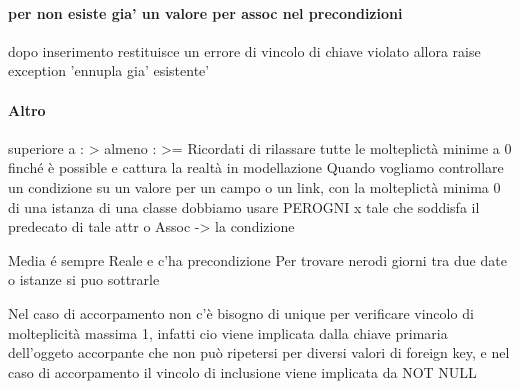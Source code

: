 \documentclass[12pt]{article}
\begin{document}
\paragraph{per non esiste gia' un valore per assoc nel precondizioni}
					dopo inserimento restituisce un errore di vincolo di chiave violato allora raise exception 'ennupla gia' esistente' 
					
\paragraph{Altro}
	superiore a : >
	almeno : >=
Ricordati di rilassare tutte le molteplictà minime a 0 finché è possible e cattura la realtà in modellazione
Quando vogliamo controllare un condizione su un valore per un campo o un link, con la molteplictà minima 0 di una istanza di una classe dobbiamo usare PEROGNI x tale che soddisfa il predecato di tale attr o Assoc -> la condizione

Media é sempre Reale e c'ha precondizione
Per trovare nerodi giorni tra due date o istanze si puo sottrarle

Nel caso di accorpamento non c'è bisogno di unique per verificare vincolo di molteplicità massima 1, infatti cio viene implicata dalla chiave primaria dell'oggeto accorpante che non può ripetersi per diversi valori di foreign key, e nel caso di accorpamento il vincolo di inclusione viene implicata da NOT NULL
\end{document}
